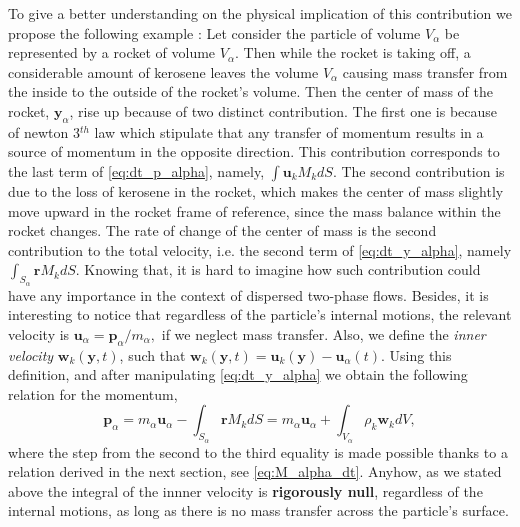 To give a better understanding on the physical implication of this contribution we propose the following example :
Let consider the particle of volume $V_\alpha$ be represented by a rocket of volume $V_\alpha$.
Then while the rocket is taking off, a considerable amount of kerosene leaves the volume $V_\alpha$ causing mass transfer from the inside to the outside of the rocket's volume.
Then the center of mass of the rocket, $\textbf{y}_\alpha$, rise up because of two distinct contribution.
The first one is because of newton 3$^{th}$ law which stipulate that any transfer of momentum results in a source of momentum in the opposite direction.
This contribution corresponds to the last term of \ref{eq:dt_p_alpha}, namely, $\int \textbf{u}_kM_k dS$.
The second contribution is due to the loss of kerosene in the rocket, which makes the center of mass slightly move upward in the rocket frame of reference, since the mass balance within the rocket changes.
The rate of change of the center of mass is the second contribution to the total velocity, i.e. the second term of \ref{eq:dt_y_alpha}, namely $\int_{S_\alpha} \textbf{r}M_kdS$.  
Knowing that, it is hard to imagine how such contribution could have any importance in the context of dispersed two-phase flows. 
Besides, it is interesting to notice that regardless of the particle's internal motions, the relevant velocity is $\textbf{u}_\alpha = \textbf{p}_\alpha /m_\alpha,$ if we neglect mass transfer.
Also, we define the \textit{inner velocity} $\textbf{w}_k(\textbf{y},t)$, such that $\textbf{w}_k(\textbf{y},t) = \textbf{u}_k(\textbf{y}) - \textbf{u}_\alpha(t)$. 
Using this definition, and after manipulating \ref{eq:dt_y_alpha} we obtain the following relation for the momentum, 
\begin{equation}
    \textbf{p}_\alpha
    =  m_\alpha \textbf{u}_\alpha
    - \int_{S_\alpha} \textbf{r} M_k dS
    = m_\alpha \textbf{u}_\alpha
    + \int_{V_\alpha} \rho_k \textbf{w}_k dV,
    \label{eq:velocity_definition}
\end{equation}
where the step from the second to the third equality is made possible thanks to a relation derived in the next section, see \ref{eq:M_alpha_dt}. 
Anyhow, as we stated above the integral of the innner velocity is \textbf{rigorously null}, regardless of the internal motions, as long as there is no mass transfer across the  particle's surface.  

